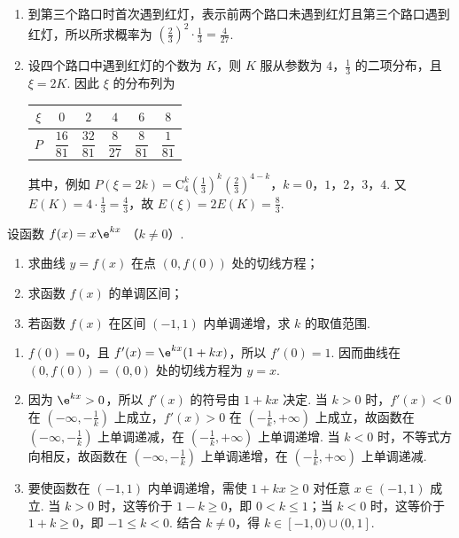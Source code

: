 \begin{solution}
\begin{enumerate}
\item 到第三个路口时首次遇到红灯，表示前两个路口未遇到红灯且第三个路口遇到红灯，所以所求概率为 \(\left(\frac23\right)^2\cdot\frac13=\frac4{27}\).
\item 设四个路口中遇到红灯的个数为 \(K\)，则 \(K\) 服从参数为 \(4\)，\(\frac13\) 的二项分布，且 \(\xi=2K\). 因此 \(\xi\) 的分布列为

\begin{center}
\begin{tabular}{c|ccccc}
\(\xi\) & \(0\) & \(2\) & \(4\) & \(6\) & \(8\) \\
\hline
\(P\) & \(\dfrac{16}{81}\) & \(\dfrac{32}{81}\) & \(\dfrac{8}{27}\) & \(\dfrac{8}{81}\) & \(\dfrac{1}{81}\)
\end{tabular}
\end{center}

其中，例如 \(P(\xi=2k)=\mathrm C_4^k\left(\frac13\right)^k\left(\frac23\right)^{4-k}\)，\(k=0\)，\(1\)，\(2\)，\(3\)，\(4\). 又 \(E(K)=4\cdot\frac13=\frac43\)，故 \(E(\xi)=2E(K)=\frac83\).
\end{enumerate}
\end{solution}

\begin{problem}
设函数 \( f(x) = x\e^{kx} \) （\(k \neq 0\)）.

\begin{enumerate}
\item 求曲线 \( y = f(x) \) 在点 \( (0, f(0)) \) 处的切线方程；
\item 求函数 \( f(x) \) 的单调区间；
\item 若函数 \( f(x) \) 在区间 \( (-1,1) \) 内单调递增，求 \(k\) 的取值范围.
\end{enumerate}
\end{problem}

\begin{solution}
\begin{enumerate}
\item \(f(0)=0\)，且 \(f'(x)=\e^{kx}(1+kx)\)，所以 \(f'(0)=1\). 因而曲线在 \((0,f(0))=(0,0)\) 处的切线方程为 \(y=x\).
\item 因为 \(\e^{kx}>0\)，所以 \(f'(x)\) 的符号由 \(1+kx\) 决定. 当 \(k>0\) 时，\(f'(x)<0\) 在 \(\left(-\infty,-\frac1k\right)\) 上成立，\(f'(x)>0\) 在 \(\left(-\frac1k,+\infty\right)\) 上成立，故函数在 \(\left(-\infty,-\frac1k\right)\) 上单调递减，在 \(\left(-\frac1k,+\infty\right)\) 上单调递增. 当 \(k<0\) 时，不等式方向相反，故函数在 \(\left(-\infty,-\frac1k\right)\) 上单调递增，在 \(\left(-\frac1k,+\infty\right)\) 上单调递减.
\item 要使函数在 \((-1,1)\) 内单调递增，需使 \(1+kx\geqslant0\) 对任意 \(x\in(-1,1)\) 成立. 当 \(k>0\) 时，这等价于 \(1-k\geqslant0\)，即 \(0<k\leqslant1\)；当 \(k<0\) 时，这等价于 \(1+k\geqslant0\)，即 \(-1\leqslant k<0\). 结合 \(k\neq0\)，得 \(k\in[-1,0)\cup(0,1]\).
\end{enumerate}
\end{solution}

